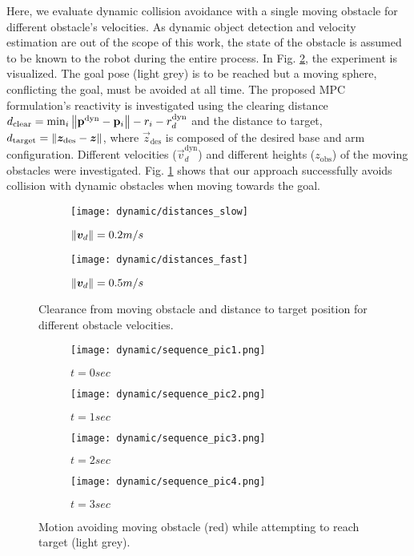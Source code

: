 Here, we evaluate dynamic collision avoidance with a single moving obstacle for different obstacle's velocities. As dynamic object detection and velocity estimation are out of the scope of this work, the state of the obstacle is assumed to be known to the robot during the entire process. In Fig. \ref{fig:dynamic_case}, the experiment is visualized. The goal pose (light grey) is to be reached but a moving sphere, conflicting the goal, must be avoided at all time. 
The proposed MPC formulation's reactivity is investigated using the clearing distance $d_{\textrm{clear}} = \min_i{\left\lVert\mathbf{p}^{\textrm{dyn}} - \mathbf{p}_{i}\right\rVert - r_i - r_d^{\textrm{dyn}}}$ and the distance to target, $d_{\textrm{target}} = \left\lVert\bm{z}_{\textrm{des}} - \bm{z}\right\rVert$, where $\vec{z}_{\textrm{des}}$ is composed of the desired base and arm configuration. Different velocities ($\vec{v}_d^{\textrm{dyn}}$) and different heights ($z_{\textrm{obs}}$) of the moving obstacles were investigated. Fig. \ref{fig:dynamic_distances} shows that our approach successfully avoids collision with dynamic obstacles when moving towards the goal. 
%
\begin{figure}[h]
  \centering
  \begin{subfigure}[b]{0.4\linewidth}
    \texttt{[image: dynamic/distances\_slow]}
        \caption{$\left\lVert\bm{v}_d\right\rVert = 0.2m/s$}
  \end{subfigure}
  \begin{subfigure}[b]{0.4\linewidth}
    \texttt{[image: dynamic/distances\_fast]}
    \caption{$\left\lVert\bm{v}_d\right\rVert = 0.5m/s$}
  \end{subfigure}
  \caption{Clearance from moving obstacle and distance to target position for different obstacle velocities.}%
  \label{fig:dynamic_distances}
\end{figure}
%
\begin{figure}[h]
  \centering
  \begin{subfigure}[b]{0.23\linewidth}
    \texttt{[image: dynamic/sequence\_pic1.png]}
    \caption{$t=0sec$}
  \end{subfigure}
  \begin{subfigure}[b]{0.23\linewidth}
    \texttt{[image: dynamic/sequence\_pic2.png]}
    \caption{$t=1sec$}
  \end{subfigure}
  \begin{subfigure}[b]{0.23\linewidth}
    \texttt{[image: dynamic/sequence\_pic3.png]}
    \caption{$t=2sec$}
  \end{subfigure}
  \begin{subfigure}[b]{0.23\linewidth}
    \texttt{[image: dynamic/sequence\_pic4.png]}
    \caption{$t=3sec$}
  \end{subfigure}
  \caption{Motion avoiding moving obstacle (red) while attempting to reach target (light grey).}%
  \label{fig:dynamic_case}
\end{figure}
%
